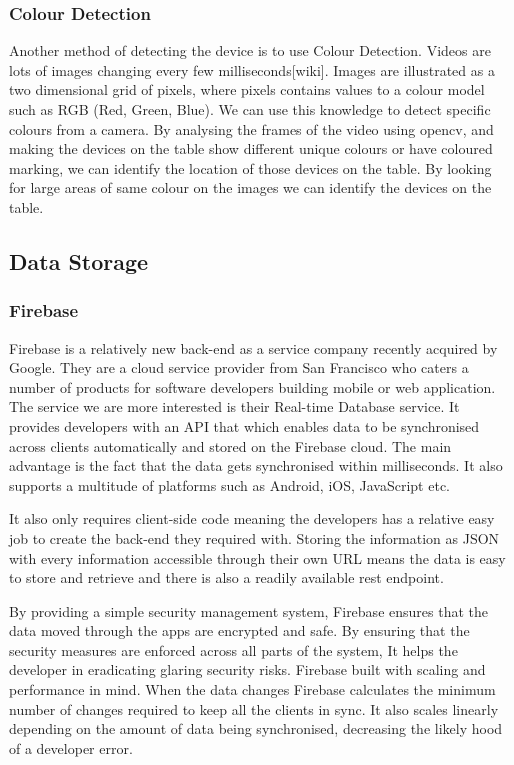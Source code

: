 \subsubsection{Colour Detection}
Another method of detecting the device is to use Colour Detection. Videos are lots of images changing every few milliseconds[wiki]. Images are illustrated as a two dimensional grid of pixels, where pixels contains values to a colour model such as RGB (Red, Green, Blue). We can use this knowledge to detect specific colours from a camera.
By analysing the frames of the video using opencv, and making the devices on the table show different unique colours or have coloured marking, we can identify the location of those devices on the table. By looking for large areas of same colour on the images we can identify the devices on the table.
\subsection{Data Storage}
\subsubsection{Firebase}

Firebase\cite{firebase} is a relatively new back-end as a service
company recently acquired by Google. They are a cloud service provider
from San Francisco who caters a number of products for software developers
building mobile or web application. The service we are more interested
is their Real-time Database service. It provides developers with an
API that which enables data to be synchronised across clients automatically
and stored on the Firebase cloud. The main advantage is the fact that
the data gets synchronised within milliseconds. It also supports a
multitude of platforms such as Android, iOS, JavaScript etc.
 
It also only requires client-side code meaning the developers has
a relative easy job to create the back-end they required with. Storing
the information as JSON with every information accessible through
their own URL means the data is easy to store and retrieve and there
is also a readily available rest endpoint.
 
By providing a simple security management system, Firebase ensures
that the data moved through the apps are encrypted and safe. By ensuring
that the security measures are enforced across all parts of the system,
It helps the developer in eradicating glaring security risks. Firebase
built with scaling and performance in mind. When the data changes
Firebase calculates the minimum number of changes required to keep
all the clients in sync. It also scales linearly depending on the
amount of data being synchronised, decreasing the likely hood of a
developer error.
 
